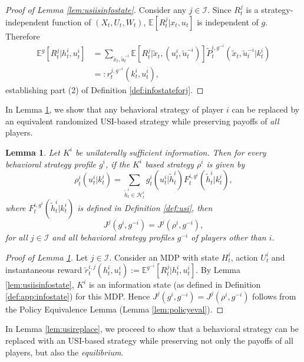 \documentclass[pdflatex,sn-basic]{sn-jnl}
\newcommand{\E}{\mathbb{E}}
\newcommand{\Comp}{K}
\newcommand{\comp}{k}
\theoremstyle{thmstyleone}%
\newtheorem{lemma}{Lemma}
\theoremstyle{thmstyletwo}%
\theoremstyle{thmstylethree}%
\begin{document}
\begin{appendices}
\begin{proof}[Proof of Lemma \ref{lem:usiisinfostate}]
	Consider any $j\in\mathcal{I}$. Since $R_t^j$ is a strategy-independent function of $(X_t, U_t, W_t)$, $\E[R_t^j|x_t, u_t]$ is independent of $g$. Therefore
	\begin{align}
		\E^g[R_t^j|h_t^i, u_t^i] &= \sum_{\tilde{x}_t, \tilde{u}_t^{-i}} \E[R_t^j|\tilde{x}_t, (u_t^i, \tilde{u}_t^{-i})] \tilde{P}_t^{i, g^{-i}}(\tilde{x}_t, \tilde{u}_t^{-i}|\comp_t^i)\\
		&=:r_t^{j, g^{-i}}(\comp_t^i, u_t^i),
	\end{align}
    {establishing part (2) of Definition \ref{def:infostateforj}.}
\end{proof}

{In Lemma \ref{lem:usiclaim}, we show that any behavioral strategy of player $i$ can be replaced by an equivalent randomized USI-based strategy while preserving payoffs of \emph{all} players.}

\begin{lemma}\label{lem:usiclaim}
	Let $\Comp^i$ be unilaterally sufficient information. Then for every behavioral strategy profile $g^i$, if the $\Comp^i$ based strategy $\rho^i$ is given by
	\begin{equation}\label{rhotheultimateequivalentstrategy}
		\rho_t^i(u_t^i|\comp_t^i) = \sum_{\tilde{h}_t^i\in\mathcal{H}_t^i}g_t^i(u_t^i|\tilde{h}_t^i)F_t^{i, g^i}(\tilde{h}_t^i|\comp_t^i),
	\end{equation}
	where $F_t^{i, g^i}(\tilde{h}_t^i|\comp_t^i)$ is defined in Definition \ref{def:usi}, then
	$$J^j(g^i, g^{-i}) = J^j(\rho^i, g^{-i}),$$
	for all $j\in\mathcal{I}$ and all behavioral strategy profiles $g^{-i}$ of players other than $i$.
\end{lemma}

\begin{proof}[Proof of Lemma \ref{lem:usiclaim}]
Let $j\in\mathcal{I}$. Consider an MDP with state $H_t^i$, action $U_t^i$ and instantaneous reward $\tilde{r}_t^{i, j}(h_t^i, u_t^i):=\E^{g^{-i}}[R_t^j|h_t^i, u_t^i]$. By Lemma \ref{lem:usiisinfostate}, $\Comp^i$ is an information state (as defined in Definition \ref{def:app:infostate}) for this MDP. Hence $J^j(g^i, g^{-i}) = J^j(\rho^i, g^{-i})$ follows from the Policy Equivalence Lemma (Lemma \ref{lem:policyeval}).
\end{proof} 

In Lemma \ref{lem:usireplace}, we proceed to show that a behavioral strategy can be replaced with an USI-based strategy while preserving not only the payoffs of all players, but also the \emph{equilibrium}.


\end{appendices}
\end{document}
